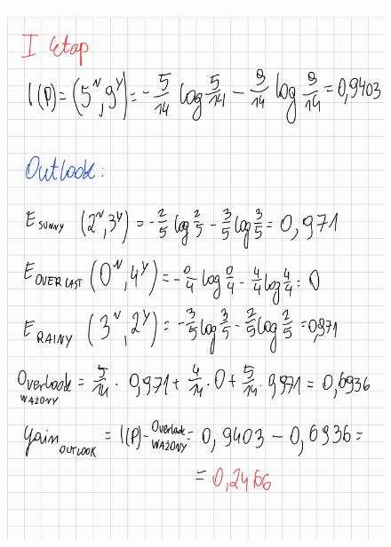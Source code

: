 \documentclass{article}
\begin{document}
\begin{figure}[H]
    \centering
    \includegraphics[width=\textwidth]{tree1.jpg}
\end{figure}
\end{document}
